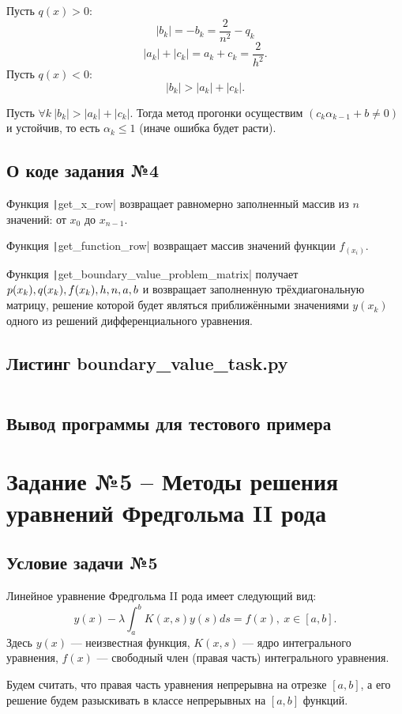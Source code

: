 Пусть $q(x) > 0:$
$$|b_k|=-b_k=\frac2{n^2}-q_k$$
$$|a_k|+|c_k|=a_k+c_k=\frac2{h^2}.$$
Пусть $q(x) < 0:$
$$|b_k|>|a_k| + |c_k|.$$

{
\theorem
    Пусть $\forall k\ |b_k| > |a_k| + |c_k|.$ Тогда метод прогонки осуществим $(c_k\alpha_{k-1}+ b\neq0)$ и устойчив, то есть $\alpha_k\leq1$ (иначе ошибка будет расти).
}

\section{О коде задания №4}
Функция \texttt|get_x_row| возвращает равномерно заполненный массив из $n$ значений: от $x_0$ до $x_{n-1}$.

Функция \texttt|get_function_row| возвращает массив значений функции $f_(x_i)$.

Функция \texttt|get_boundary_value_problem_matrix| получает $p(x_k), q(x_k), f(x_k),\\ h, n, a, b$ и возвращает заполненную трёхдиагональную матрицу, решение которой будет являться приближёнными значениями $y(x_k)$ одного из решений дифференциального уравнения.

\section{Листинг boundary\_value\_task.py}
\inputminted{python}{code/boundary_value_task.py}

\section{Вывод программы для тестового примера}




\chapter{Задание №5 -- Методы решения уравнений Фредгольма II рода}
\section{Условие задачи №5}
Линейное уравнение Фредгольма II рода имеет следующий вид:
$$y(x) - \lambda\int_a^bK(x,s)y(s)ds = f(x),\ x \in [a,b].$$
Здесь $y(x)$ — неизвестная функция, $K(x, s)$ — ядро интегрального уравнения, $f(x)$ — свободный член (правая часть) интегрального уравнения. 

Будем считать, что правая часть уравнения непрерывна на отрезке $[a, b]$, а его решение будем разыскивать в
классе непрерывных на $[a, b]$ функций.
